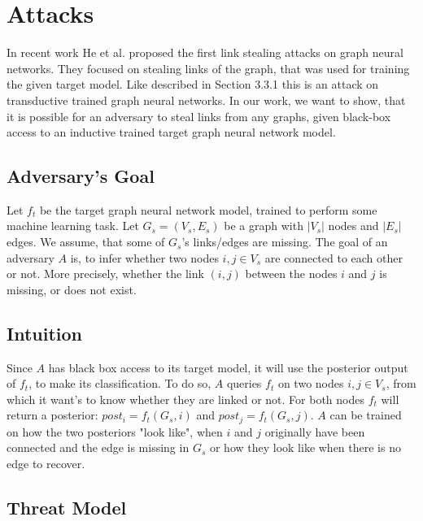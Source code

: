\chapter{Attacks}

  In recent work He et al. \cite{DBLP:journals/corr/abs-2005-02131} proposed the first link stealing attacks on graph neural networks.
  They focused on stealing links of the graph, that was used for training the given target model.
  Like described in Section 3.3.1 this is an attack on transductive trained graph neural networks.
  In our work, we want to show, that it is possible for an adversary to steal links from any graphs, given black-box access to an inductive trained target graph neural network model.

  \section{Adversary's Goal}

    Let $f_t$ be the target graph neural network model, trained to perform some machine learning task.
    Let $G_s = (V_s, E_s)$ be a graph with $|V_s|$ nodes and $|E_s|$ edges. 
    We assume, that some of $G_s$'s links/edges are missing.
    The goal of an adversary $A$ is, to infer whether two nodes $i,j \in V_s$ are connected to each other or not.
    More precisely, whether the link $(i,j)$ between the nodes $i$ and $j$ is missing, or does not exist.
  
  \section{Intuition}

    Since $A$ has black box access to its target model, it will use the posterior output of $f_t$, to make its classification.
    To do so, $A$ queries $f_t$ on two nodes $i,j \in V_s$, from which it want's to know whether they are linked or not.
    For both nodes $f_t$ will return a posterior: $post_i = f_t(G_s, i)$ and $post_j = f_t(G_s, j)$.
    $A$ can be trained on how the two posteriors "look like", when $i$ and $j$ originally have been connected and the edge is missing in $G_s$ or how they look like when there is no edge to recover.


  \section{Threat Model}

